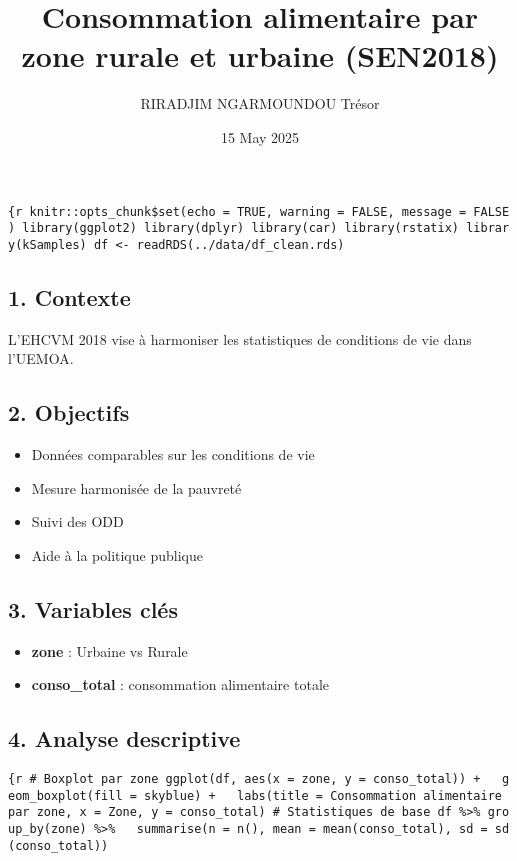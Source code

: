 \documentclass[
]{article}
\title{Consommation alimentaire par zone rurale et urbaine (SEN2018)}
\author{RIRADJIM NGARMOUNDOU Trésor}
\date{15 May 2025}
\providecommand{\tightlist}{%
  \setlength{\itemsep}{0pt}\setlength{\parskip}{0pt}}
\begin{document}
\maketitle

\texttt{\{r\ knitr::opts\_chunk\$set(echo\ =\ TRUE,\ warning\ =\ FALSE,\ message\ =\ FALSE)\ library(ggplot2)\ library(dplyr)\ library(car)\ library(rstatix)\ library(kSamples)\ df\ \textless{}-\ readRDS(\textquotesingle{}../data/df\_clean.rds\textquotesingle{})}

\subsection{1. Contexte}\label{contexte}

L'EHCVM 2018 vise à harmoniser les statistiques de conditions de vie
dans l'UEMOA.

\subsection{2. Objectifs}\label{objectifs}

\begin{itemize}
\tightlist
\item
  Données comparables sur les conditions de vie
\item
  Mesure harmonisée de la pauvreté
\item
  Suivi des ODD
\item
  Aide à la politique publique
\end{itemize}

\subsection{3. Variables clés}\label{variables-cluxe9s}

\begin{itemize}
\tightlist
\item
  \textbf{zone} : Urbaine vs Rurale
\item
  \textbf{conso\_total} : consommation alimentaire totale
\end{itemize}

\subsection{4. Analyse descriptive}\label{analyse-descriptive}

\texttt{\{r\ \#\ Boxplot\ par\ zone\ ggplot(df,\ aes(x\ =\ zone,\ y\ =\ conso\_total))\ +\ \ \ geom\_boxplot(fill\ =\ \textquotesingle{}skyblue\textquotesingle{})\ +\ \ \ labs(title\ =\ \textquotesingle{}Consommation\ alimentaire\ par\ zone\textquotesingle{},\ x\ =\ \textquotesingle{}Zone\textquotesingle{},\ y\ =\ \textquotesingle{}conso\_total\textquotesingle{})\ \#\ Statistiques\ de\ base\ df\ \%\textgreater{}\%\ group\_by(zone)\ \%\textgreater{}\%\ \ \ summarise(n\ =\ n(),\ mean\ =\ mean(conso\_total),\ sd\ =\ sd(conso\_total))}
\end{document}
